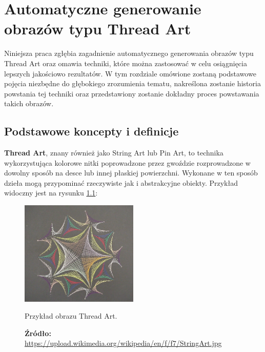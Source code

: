 \documentclass[a4paper, 12pt, polish, twoside]{extreport}
\begin{document}
\chapter{Automatyczne generowanie obrazów typu Thread Art} \label{theory}
Niniejsza praca zgłębia zagadnienie automatycznego generowania obrazów typu Thread Art oraz omawia techniki, które można zastosować w celu osiągnięcia lepszych jakościowo rezultatów. W tym rozdziale omówione zostaną podstawowe pojęcia niezbędne do głębokiego zrozumienia tematu, nakreślona zostanie historia powstania tej techniki oraz przedstawiony zostanie dokładny proces powstawania takich obrazów.
    \section{Podstawowe koncepty i definicje} \label{theory-definitions}
    \textbf{Thread Art}, znany również jako String Art lub Pin Art, to technika wykorzystująca kolorowe nitki poprowadzone przez gwoździe rozprowadzone w dowolny sposób na desce lub innej płaskiej powierzchni. Wykonane w ten sposób dzieła mogą przypominać rzeczywiste jak i abstrakcyjne obiekty. Przykład widoczny jest na rysunku \ref{theory-thread-art}:
    \begin{figure}[H]
        \centering
        \includegraphics[width=0.5\textwidth,keepaspectratio]{img/2-theory/thread-art.jpg}
        \caption[Przykład obrazu Thread Art]{Przykład obrazu Thread Art.}
        \caption*{\footnotesize{\textbf{Źródło:} {\url{https://upload.wikimedia.org/wikipedia/en/f/f7/StringArt.jpg}}}}
        \label{theory-thread-art}
    \end{figure}
    
\end{document}
